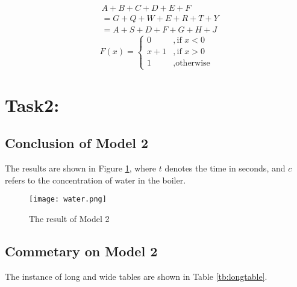 \documentclass[12pt]{article}  %
\begin{document}
\begin{equation}\label{eq2}
	\begin{split}
	&A+B+C+D+E+F\\
	&=G+Q+W+E+R+T+Y\\
	&=A+S+D+F+G+H+J
	\end{split}
\end{equation}
\begin{equation}\label{eq3}
	F(x)=
	\begin{cases}
		0&,\text{if $x<0$}\\
		x+1&,\text{if $x>0$}\\
		1&,\text{otherwise}
			\end{cases}
\end{equation}

\section{Task2:}
\subsection{Conclusion of Model 2}
The results are shown in Figure \ref{fig:result}, where $t$ denotes the time in seconds, and $c$ refers to the concentration of water in the boiler.

\begin{figure}[htbp]
\centering
\texttt{[image: water.png]}
\caption{The result of Model 2}\label{fig:result}
\end{figure}

\clearpage
\subsection{Commetary on Model 2}
The instance of long and wide tables are shown in Table \ref{tb:longtable}.
\end{document}
